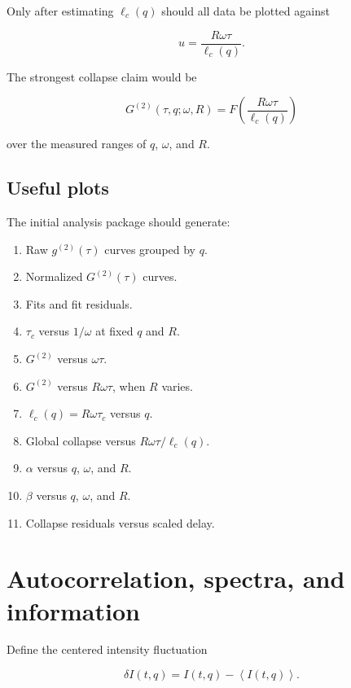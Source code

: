 \documentclass[11pt,letterpaper]{article}
\newcommand{\gtt}{g^{(2)}}
\newcommand{\Gnorm}{G^{(2)}}
\newcommand{\avg}[1]{\left\langle #1 \right\rangle}
\begin{document}
Only after estimating $\ell_c(q)$ should all data be plotted against

\begin{equation}
    u=\frac{R\omega\tau}{\ell_c(q)}.
\end{equation}

The strongest collapse claim would be

\begin{equation}
    \boxed{
    \Gnorm(\tau,q;\omega,R)
    =
    F\left(
    \frac{R\omega\tau}{\ell_c(q)}
    \right)
    }
\end{equation}

over the measured ranges of $q$, $\omega$, and $R$.

\subsection{Useful plots}

The initial analysis package should generate:

\begin{enumerate}[leftmargin=2em]
    \item Raw $\gtt(\tau)$ curves grouped by $q$.
    \item Normalized $\Gnorm(\tau)$ curves.
    \item Fits and fit residuals.
    \item $\tau_c$ versus $1/\omega$ at fixed $q$ and $R$.
    \item $\Gnorm$ versus $\omega\tau$.
    \item $\Gnorm$ versus $R\omega\tau$, when $R$ varies.
    \item $\ell_c(q)=R\omega\tau_c$ versus $q$.
    \item Global collapse versus $R\omega\tau/\ell_c(q)$.
    \item $\alpha$ versus $q$, $\omega$, and $R$.
    \item $\beta$ versus $q$, $\omega$, and $R$.
    \item Collapse residuals versus scaled delay.
\end{enumerate}

\section{Autocorrelation, spectra, and information}

Define the centered intensity fluctuation

\begin{equation}
    \delta I(t,q)=I(t,q)-\avg{I(t,q)}.
\end{equation}
\end{document}
